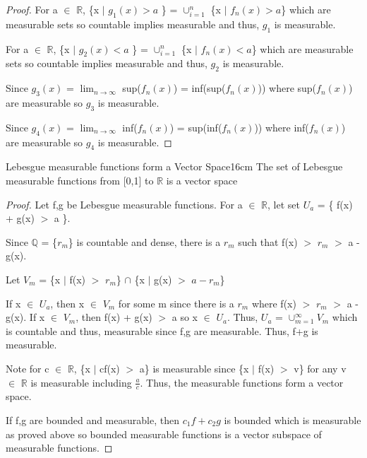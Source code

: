     \begin{proof}
        For a $\in$ $\mathbb{R}$, \{x $|$ $g_1(x) > a$ \}
        = $\cup_{i=1}^n$ \{x $|$ $f_n(x) > a$\}
        which are measurable sets so countable implies measurable
        and thus, $g_1$ is measurable.

        For a $\in$ $\mathbb{R}$, \{x $|$ $g_2(x) < a$ \}
        = $\cup_{i=1}^n$ \{x $|$ $f_n(x) < a$\}
        which are measurable sets so countable implies measurable
        and thus, $g_2$ is measurable.

        Since $g_3(x)$ = $\lim_{n \rightarrow \infty}$ sup($f_n(x)$)
        = inf(sup($f_n(x)$)) where sup($f_n(x)$) are measurable
        so $g_3$ is measurable.

        Since $g_4(x)$ = $\lim_{n \rightarrow \infty}$ inf($f_n(x)$)
        = sup(inf($f_n(x)$)) where inf($f_n(x)$) are measurable
        so $g_4$ is measurable.
    \end{proof}

    \newpage



    \begin{wtheorem}{Lebesgue measurable functions form a Vector Space}{16cm}
        The set of Lebesgue measurable functions from [0,1] to $\mathbb{R}$
        is a vector space
    \end{wtheorem}

    \begin{proof}
        Let f,g be Lebesgue measurable functions.
        For a $\in$ $\mathbb{R}$, let set $U_a$ = \{ f(x) + g(x) $>$ a \}.

        Since $\mathbb{Q}$ = \{$r_m$\} is countable and dense, there is a
        $r_m$ such that f(x) $>$ $r_m$ $>$ a - g(x).

        Let $V_m$ = \{x $|$ f(x) $>$ $r_m$\} $\cap$ \{x $|$ g(x) $>$ $a-r_m$\}
        
        If x $\in$ $U_a$, then x $\in$ $V_m$ for some m since
        there is a $r_m$ where f(x) $>$ $r_m$ $>$ a - g(x). 
        If x $\in$ $V_m$, then f(x) + g(x) $>$ a so x $\in$ $U_a$.
        Thus, $U_a$ = $\cup_{m=1}^{\infty} V_m$
        which is countable and thus, measurable since f,g are measurable.
        Thus, f+g is measurable.

        Note for c $\in$ $\mathbb{R}$, \{x $|$ cf(x) $>$ a\}
        is measurable since \{x $|$ f(x) $>$ v\} for any v $\in$ $\mathbb{R}$
        is measurable including $\frac{a}{c}$.
        Thus, the measurable functions form a vector space.

        If f,g are bounded and measurable, then $c_1f+c_2g$ is bounded which
        is measurable as proved above so bounded measurable functions is
        a vector subspace of measurable functions.
    \end{proof}

